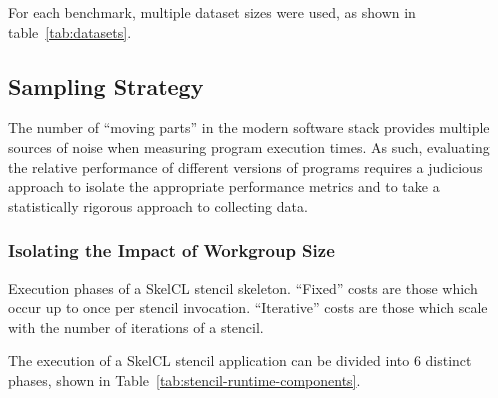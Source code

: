 For each benchmark, multiple dataset sizes were used, as shown in
table~\ref{tab:datasets}.

\begin{table}

\caption{%
  Datasets used.%
}
\label{tab:datasets}
\end{table}


\subsection{Sampling Strategy}

The number of ``moving parts'' in the modern software stack provides
multiple sources of noise when measuring program execution times. As
such, evaluating the relative performance of different versions of
programs requires a judicious approach to isolate the appropriate
performance metrics and to take a statistically rigorous approach to
collecting data.

\subsubsection{Isolating the Impact of Workgroup Size}

\begin{table}

\caption{Execution phases of a SkelCL stencil skeleton. ``Fixed''
  costs are those which occur up to once per stencil
  invocation. ``Iterative'' costs are those which scale with the
  number of iterations of a stencil.}
\label{tab:stencil-runtime-components}
\end{table}

The execution of a SkelCL stencil application can be divided into 6
distinct phases, shown in Table~\ref{tab:stencil-runtime-components}.

